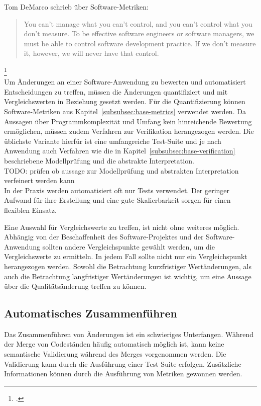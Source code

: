 Tom DeMarco schrieb über Software-Metriken:

\blockquote{You can’t manage what you can’t control, and you can’t control what you
don’t measure. To be effective software engineers or software managers, we
must be able to control software development practice. If we don’t measure
it, however, we will never have that control.}\footcite{demarco1986}
\\

Um Änderungen an einer Software-Anwendung zu bewerten und automatisiert Entscheidungen zu treffen, müssen die Änderungen quantifiziert und mit Vergleichswerten in Beziehung gesetzt werden. Für die Quantifizierung können Software-Metriken aus  Kapitel~\ref{subsubsec:base-metrics} verwendet werden. Da Aussagen über Programmkomplexität und Umfang kein hinreichende Bewertung ermöglichen, müssen zudem Verfahren zur Verifikation herangezogen werden. Die üblichste Variante hierfür ist eine umfangreiche Test-Suite und je nach Anwendung auch Verfahren wie die in Kapitel~\ref{subsubsec:base-verification} beschriebene Modellprüfung und die abstrakte Interpretation.
\\
TODO: prüfen ob aussage zur Modellprüfung und abstrakten Interpretation verfeinert werden kann
\\
In der Praxis werden automatisiert oft nur Tests verwendet. Der geringer Aufwand für ihre Erstellung und eine gute Skalierbarkeit sorgen für einen flexiblen Einsatz. 

Eine Auswahl für Vergleichswerte zu treffen, ist nicht ohne weiteres möglich. Abhängig von der Beschaffenheit des Software-Projektes und der Software-Anwendung sollten andere Vergleichspunkte gewählt werden, um die Vergleichswerte zu ermitteln. In jedem Fall sollte nicht nur ein Vergleichspunkt herangezogen werden. Sowohl die Betrachtung kurzfristiger Wertänderungen, als auch die Betrachtung langfristiger Wertänderungen ist wichtig, um eine Aussage über die Qualitätsänderung treffen zu können.

\subsection{Automatisches Zusammenführen}

Das Zusammenführen von Änderungen ist ein schwieriges Unterfangen. Während der Merge von Codeständen häufig automatisch möglich ist, kann keine semantische Validierung während des Merges vorgenommen werden. Die Validierung kann durch die Ausführung einer Test-Suite erfolgen. Zusätzliche Informationen können durch die Ausführung von Metriken gewonnen werden.

